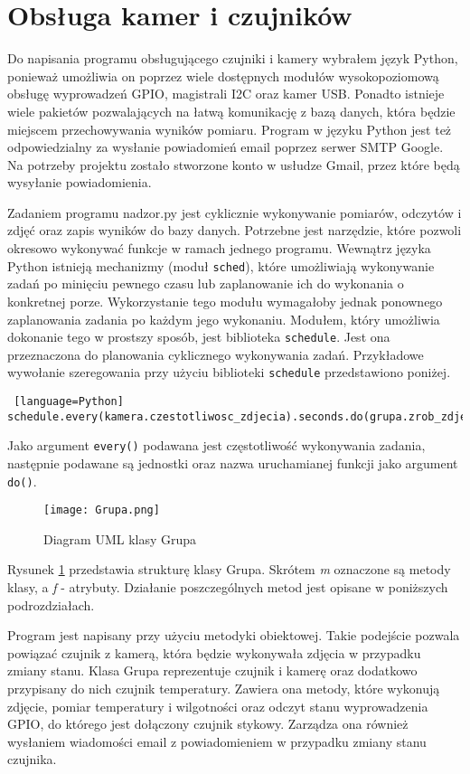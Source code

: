 \documentclass[a4paper,11pt,twoside]{article}
\begin{document}
\newpage
\section{Obsługa kamer i czujników}
Do napisania programu obsługującego czujniki i kamery wybrałem język Python, ponieważ umożliwia on poprzez wiele dostępnych modułów wysokopoziomową obsługę wyprowadzeń GPIO, magistrali I2C oraz kamer USB. Ponadto istnieje wiele pakietów pozwalających na łatwą komunikację z bazą danych, która będzie miejscem przechowywania wyników pomiaru. Program w języku Python jest też odpowiedzialny za wysłanie powiadomień email poprzez serwer SMTP Google. Na potrzeby projektu zostało stworzone konto w usłudze Gmail, przez które będą wysyłanie powiadomienia. 

Zadaniem programu nadzor.py jest cyklicznie wykonywanie pomiarów, odczytów i zdjęć oraz zapis wyników do bazy danych. Potrzebne jest narzędzie, które pozwoli okresowo wykonywać funkcje w ramach jednego programu. Wewnątrz języka Python istnieją mechanizmy (moduł \texttt{sched}), które umożliwiają wykonywanie zadań po minięciu pewnego czasu lub zaplanowanie ich do wykonania o konkretnej porze. Wykorzystanie tego modułu wymagałoby jednak ponownego zaplanowania zadania po każdym jego wykonaniu. Modułem, który umożliwia dokonanie tego w prostszy sposób, jest biblioteka \texttt{schedule}. Jest ona przeznaczona do planowania cyklicznego wykonywania zadań. Przykładowe wywołanie szeregowania przy użyciu biblioteki \texttt{schedule} przedstawiono poniżej.
\begin{lstlisting} [language=Python]
schedule.every(kamera.czestotliwosc_zdjecia).seconds.do(grupa.zrob_zdjecie)
\end{lstlisting}
Jako argument \texttt{every()} podawana jest częstotliwość wykonywania zadania, następnie podawane są jednostki oraz nazwa uruchamianej funkcji jako argument \texttt{do()}.

\begin{figure}[H]
\begin{center}
\texttt{[image: Grupa.png]}
\caption{Diagram UML klasy Grupa}
\label{fig: Grupa}
\end{center}
\end{figure}

Rysunek \ref{fig: Grupa} przedstawia strukturę klasy Grupa. Skrótem \textit{m} oznaczone są metody klasy, a \textit{f} - atrybuty. Działanie poszczególnych metod jest opisane w poniższych podrozdziałach. 

Program jest napisany przy użyciu metodyki obiektowej. Takie podejście pozwala powiązać czujnik z kamerą, która będzie wykonywała zdjęcia w przypadku zmiany stanu. Klasa Grupa reprezentuje czujnik i kamerę oraz dodatkowo przypisany do nich czujnik temperatury. Zawiera ona metody, które wykonują zdjęcie, pomiar temperatury i wilgotności oraz odczyt stanu wyprowadzenia GPIO, do którego jest dołączony czujnik stykowy. Zarządza ona również wysłaniem wiadomości email z powiadomieniem w przypadku zmiany stanu czujnika.
\end{document}
